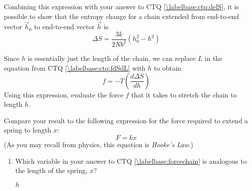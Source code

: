\begin{activity}
\begin{infobox}
	Combining this expression with your answer to CTQ \ref{\labelbase:ctq:delS}, it is possible to show that the entropy change for a chain extended from end-to-end vector $\vec h_0$ to end-to-end vector $\vec h$ is
	\begin{equation*}
		\Delta S = \frac{3 k}{2 Nb^2}\left( h_0^2 - h^2 \right)
	\end{equation*}
	
\end{infobox}

\begin{ctqs}
	
	\question Since $h$ is essentially just the length of the chain, we can replace $L$ in the equation from CTQ \ref{\labelbase:ctq:fdSdL} with $h$ to obtain
		\begin{equation*}
			f = -T\left(\frac{d\Delta S}{dh}\right)
		\end{equation*}
		Using this expression, evaluate the force $f$ that it takes to stretch the chain to length $h$.
		\label{\labelbase:forcechain}
		
		\begin{solution}[2.5in]\end{solution}
		
	\question Compare your result to the following expression for the force required to extend a spring to length $x$:
		\begin{equation*}
			F = kx
		\end{equation*}
		(As you may recall from physics, this equation is \emph{Hooke's Law}.)
		
		\begin{enumerate}
			\item Which variable in your answer to CTQ \ref{\labelbase:forcechain} is analogous to the length of the spring, $x$?
		
				\begin{solution}[0.75in]
					$h$
				\end{solution}
			

\end{enumerate}
\end{ctqs}
\end{activity}
